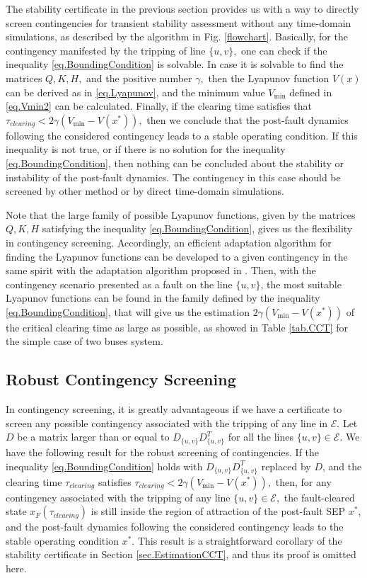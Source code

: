 \documentclass[final]{IEEEtran}
\begin{document}
The stability certificate in the previous section provides us with
a way to directly screen contingencies for transient stability assessment
without any time-domain simulations, as described by the algorithm in Fig. \ref{flowchart}. Basically, for the
contingency manifested by the tripping of line $\{u,v\},$ one can
check if the inequality \eqref{eq.BoundingCondition} is solvable.
In case it is solvable to find the matrices $Q,K,H,$
and the positive number $\gamma,$ then the Lyapunov
function $V(x)$ can be derived as in \eqref{eq.Lyapunov}, and the minimum
value $V_{\min}$ defined in \eqref{eq.Vmin2} can be calculated. Finally, if the
clearing time satisfies that $\tau_{clearing}<2\gamma (V_{\min}-V(x^*)),$ 
then we conclude that the
post-fault dynamics following the considered contingency leads to
a stable operating condition. If this inequality is not true, or
if there is no solution for the inequality
\eqref{eq.BoundingCondition}, then nothing can be concluded 
about the stability or instability of the post-fault dynamics. The
contingency in this case should be screened by other method or by
direct time-domain simulations.


Note that the large family of possible Lyapunov functions,
given by the matrices $Q,K,H$ satisfying the inequality
\eqref{eq.BoundingCondition}, gives us the flexibility in
contingency screening. Accordingly, an efficient adaptation algorithm for finding the
Lyapunov functions can be developed to a given contingency in the same spirit with
the adaptation algorithm proposed in \cite{Vu:2014}. Then, with the
contingency scenario presented as a fault on the line
$\{u,v\}$, the most suitable Lyapunov functions can be found in the
family defined by the inequality \eqref{eq.BoundingCondition}, that
will give us the estimation  $2\gamma (V_{\min}-V(x^*))$ of the 
critical clearing time as large as possible, as showed in Table
\ref{tab.CCT} for the simple case of two buses system.

\subsection{Robust Contingency Screening}

In contingency screening, it is greatly advantageous if we have a certificate to screen any possible contingency associated
with the tripping of any line in $\mathcal{E}$. Let $D$ be a
matrix larger than or equal to $D_{\{u,v\}}D_{\{u,v\}}^T$ for all
the lines $\{u,v\}\in \mathcal{E}.$ We have the following result
for the robust screening of contingencies.
If the inequality
\eqref{eq.BoundingCondition} holds with $D_{\{u,v\}}D_{\{u,v\}}^T$
replaced by $D$, and the clearing time $\tau_{clearing}$ satisfies
$\tau_{clearing}< 2\gamma (V_{\min}-V(x^*)),$  then, for any contingency associated with the
tripping of any line $\{u,v\}\in \mathcal{E},$ the fault-cleared state
$x_F(\tau_{clearing})$ is still inside the region of attraction of
the post-fault SEP $x^*$, and the post-fault dynamics following
the considered contingency leads to the stable operating condition
$x^*$. This result is a straightforward corollary of the stability
certificate in Section \ref{sec.EstimationCCT}, and thus its proof
is omitted here.
\end{document}
